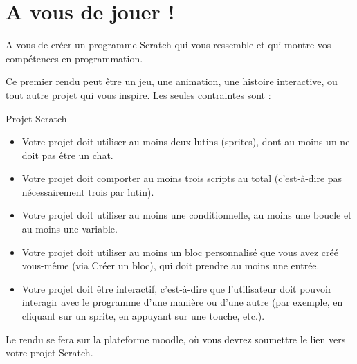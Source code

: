 \section{A vous de jouer !}
A vous de créer un programme Scratch qui vous ressemble et qui montre vos compétences en programmation.

Ce premier rendu peut être un jeu, une animation, une histoire interactive, ou tout autre projet qui vous inspire. Les seules contraintes sont : 
\begin{UPSTIaRendre}{Projet Scratch}    
    \begin{itemize}
    \item Votre projet doit utiliser au moins deux lutins (sprites), dont au moins un ne doit pas être un chat.
    \item Votre projet doit comporter au moins trois scripts au total (c'est-à-dire pas nécessairement trois par lutin).
    \item Votre projet doit utiliser au moins une conditionnelle, au moins une boucle et au moins une variable.
    \item Votre projet doit utiliser au moins un bloc personnalisé que vous avez créé vous-même (via Créer un bloc), qui doit prendre au moins une entrée.
    \item Votre projet doit être interactif, c'est-à-dire que l'utilisateur doit pouvoir interagir avec le programme d'une manière ou d'une autre (par exemple, en cliquant sur un sprite, en appuyant sur une touche, etc.).
    \end{itemize}
\end{UPSTIaRendre}

Le rendu se fera sur la plateforme moodle, où vous devrez soumettre le lien vers votre projet Scratch.  